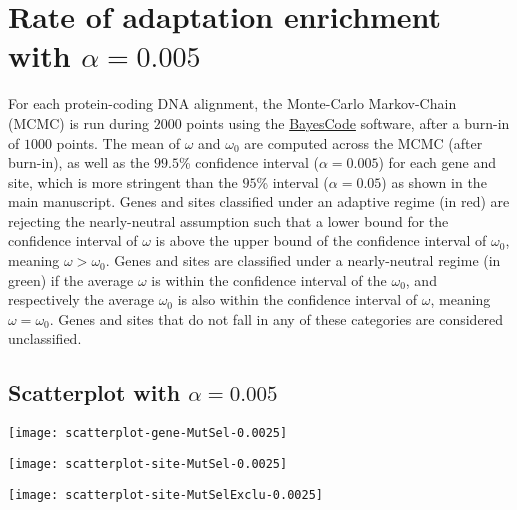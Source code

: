 \documentclass{article}
\renewcommand*{\bm}[1]{#1}%
\begin{document}
    

    \pagebreak


    \section{Rate of adaptation enrichment with $\bm{\alpha=0.005}$}
    \label{sec:threshold}
    For each protein-coding DNA alignment, the Monte-Carlo Markov-Chain (MCMC) is run during $2000$ points using the \href{https://github.com/bayesiancook/bayescode}{BayesCode} software, after a burn-in of $1000$ points.
    The mean of $\omega$ and $\omega_{0}$ are computed across the MCMC (after burn-in), as well as the $99.5$\% confidence interval ($\alpha=0.005$) for each gene and site, which is more stringent than the $95$\% interval ($\alpha=0.05$) as shown in the main manuscript.
    Genes and sites classified under an adaptive regime (in red) are rejecting the nearly-neutral assumption such that a lower bound for the confidence interval of $\omega$ is above the upper bound of the confidence interval of $\omega_{0}$, meaning $\omega > \omega_{0}$.
    Genes and sites are classified under a nearly-neutral regime (in green) if the average $\omega$ is within the confidence interval of the $\omega_{0}$, and respectively the average $\omega_{0}$ is also within the confidence interval of  $\omega$, meaning $\omega = \omega_{0}$.
    Genes and sites that do not fall in any of these categories are considered unclassified.

    \subsection{Scatterplot with $\bm{\alpha=0.005}$}

    \begin{center}
        \begin{minipage}{0.32\linewidth}
            \texttt{[image: scatterplot-gene-MutSel-0.0025]}
        \end{minipage}
        \hfill
        \begin{minipage}{0.32\linewidth}
            \texttt{[image: scatterplot-site-MutSel-0.0025]}
        \end{minipage}
        \hfill
        \begin{minipage}{0.32\linewidth}
            \texttt{[image: scatterplot-site-MutSelExclu-0.0025]}
        \end{minipage}
        \hfill
    \end{center}
\end{document}

